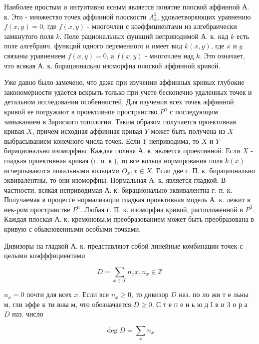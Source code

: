 \documentclass[10pt]{article}
\begin{document}
Наиболее простым и интуитивно ясным является понятие плоской аффинной А. к. Это - множество точек аффинной плоскости $A_{k}^{2}$, удовлетворяющих уравнению $f(x, y)=0$, где $f(x, y)$ - многочлен с коәффициентами из алгебраически замкнутого поля $k$. Поле рациональных функций неприводимой А. к. над $k$ есть поле алгебраич. функций одного переменного и имеет вид $k(x, y)$, где $x$ и $y$ связаны уравнением $f(x, y)=0$, а $f(x, y)$ - многочлен над $k$. Это означает, что всякая А. к. бирационально изоморфна плоской аффинной кривой.



Уже давно было замечено, что даже при изучении аффинных кривых глубокие закономерности удается вскрыть только при учете бесконечно удаленных точек и детальном исследовании особенностей. Для изучения всех точек аффинной кривой ее погружают в проективное пространство $P^{n}$ с последующим замыканием в Зариского топологии. Таким образом получается проективная кривая $X$, причем исходная аффинная кривая $Y$ может быть получена из $X$ выбрасыванием конечного числа точек. Если $Y$ неприводима, то $X$ и $Y$ бирационально изоморфны. Каждая полная А. к. является проективной. Если $X$ - гладкая проективная кривая (г. п. к.), то все кольца нормирования поля $k(x)$ исчерпываются локальными кольцами $O_{x}, x \in X$. Если две г. П. к. бирационально эквивалентны, то они изоморфны. Нормальная А. к. является гладкой. В частности, всякая неприводимая А. к. бирационально эквивалентна г. п. к. Получаемая в процессе нормализации гладкая проективная модель А. к. лежит в нек-ром пространстве $P^{n}$. Любая г. П. к. изоморфна кривой, расположенной в $P^{3}$. Каждая плоская А. к. кремоновы.м преобразованием может быть преобразована в кривую с обыкновенными особыми точками.



Дивизоры на гладкой А. к. представляют собой линейные комбинации точек с целыми коэфффициентами



\[

D=\sum_{x \in X} n_{x} x, n_{x} \in \mathbb{Z}

\]



$n_{x}=0$ почти для всех $x$. Если все $n_{x} \geqslant 0$, то дивизор $D$ наз. по ло жи т е льны м, гли эффе к ти вны м, что обозначается $D \geqslant 0$. С т е п е н ь ю д І в и 3 о р а $D$ наз. число



\[

\operatorname{deg} D=\sum_{x} n_{x}

\]
\end{document}
